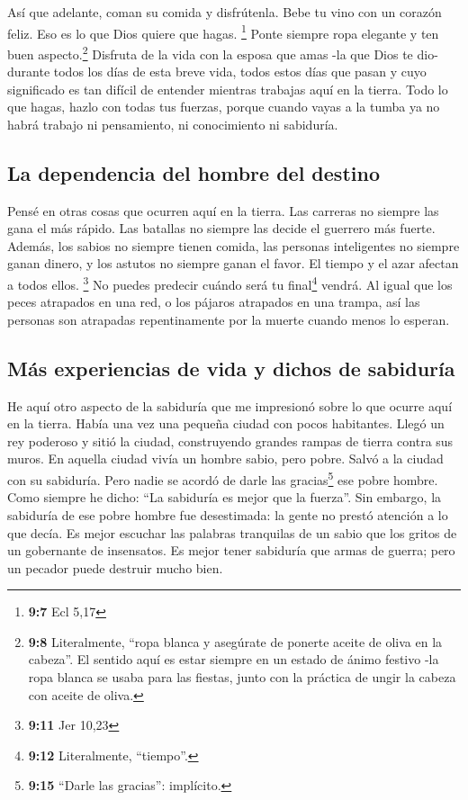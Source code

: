 Así que adelante, coman su comida y disfrútenla. Bebe tu
vino con un corazón feliz. Eso es lo que Dios quiere que hagas.
\footnote{\textbf{9:7} Ecl 5,17}  Ponte siempre ropa
elegante y ten buen aspecto.\footnote{\textbf{9:8} Literalmente, ``ropa
  blanca y asegúrate de ponerte aceite de oliva en la cabeza''. El
  sentido aquí es estar siempre en un estado de ánimo festivo -la ropa
  blanca se usaba para las fiestas, junto con la práctica de ungir la
  cabeza con aceite de oliva.}  Disfruta de la vida con la
esposa que amas -la que Dios te dio- durante todos los días de esta
breve vida, todos estos días que pasan y cuyo significado es tan difícil
de entender mientras trabajas aquí en la tierra.  Todo lo
que hagas, hazlo con todas tus fuerzas, porque cuando vayas a la tumba
ya no habrá trabajo ni pensamiento, ni conocimiento ni sabiduría.

\hypertarget{la-dependencia-del-hombre-del-destino}{%
\subsection{La dependencia del hombre del
destino}\label{la-dependencia-del-hombre-del-destino}}

 Pensé en otras cosas que ocurren aquí en la tierra. Las
carreras no siempre las gana el más rápido. Las batallas no siempre las
decide el guerrero más fuerte. Además, los sabios no siempre tienen
comida, las personas inteligentes no siempre ganan dinero, y los astutos
no siempre ganan el favor. El tiempo y el azar afectan a todos ellos.
\footnote{\textbf{9:11} Jer 10,23}  No puedes predecir
cuándo será tu final\footnote{\textbf{9:12} Literalmente, ``tiempo''.}
vendrá. Al igual que los peces atrapados en una red, o los pájaros
atrapados en una trampa, así las personas son atrapadas repentinamente
por la muerte cuando menos lo esperan.

\hypertarget{muxe1s-experiencias-de-vida-y-dichos-de-sabiduruxeda}{%
\subsection{Más experiencias de vida y dichos de
sabiduría}\label{muxe1s-experiencias-de-vida-y-dichos-de-sabiduruxeda}}

 He aquí otro aspecto de la sabiduría que me impresionó
sobre lo que ocurre aquí en la tierra.  Había una vez una
pequeña ciudad con pocos habitantes. Llegó un rey poderoso y sitió la
ciudad, construyendo grandes rampas de tierra contra sus muros.
 En aquella ciudad vivía un hombre sabio, pero pobre.
Salvó a la ciudad con su sabiduría. Pero nadie se acordó de darle las
gracias\footnote{\textbf{9:15} ``Darle las gracias'': implícito.} ese
pobre hombre.  Como siempre he dicho: ``La sabiduría es
mejor que la fuerza''. Sin embargo, la sabiduría de ese pobre hombre fue
desestimada: la gente no prestó atención a lo que decía. 
Es mejor escuchar las palabras tranquilas de un sabio que los gritos de
un gobernante de insensatos.  Es mejor tener sabiduría
que armas de guerra; pero un pecador puede destruir mucho bien.

